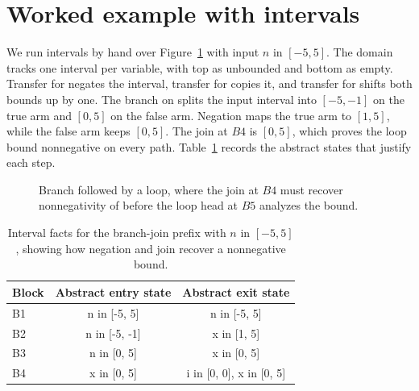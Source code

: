 \section{Worked example with intervals}
\label{sec:ch11-worked}

We run intervals by hand over Figure~\ref{fig:ch11-branch-loop} with input $n$ in $[-5, 5]$.
The domain tracks one interval per variable, with top as unbounded and bottom as empty.
Transfer for  negates the interval, transfer for  copies it, and transfer for  shifts both bounds up by one.
The branch on  splits the input interval into $[-5, -1]$ on the true arm and $[0, 5]$ on the false arm.
Negation maps the true arm to $[1, 5]$, while the false arm keeps $[0, 5]$.
The join at $B4$ is $[0, 5]$, which proves the loop bound nonnegative on every path.
Table~\ref{tab:ch11-intervals} records the abstract states that justify each step.

\begin{figure}
\caption{Branch followed by a loop, where the join at $B4$ must recover nonnegativity of  before the loop head at $B5$ analyzes the bound.}
\label{fig:ch11-branch-loop}
\end{figure}

\begin{table}
\caption{Interval facts for the branch-join prefix with $n$ in $[-5, 5]$, showing how negation and join recover a nonnegative bound.}
\label{tab:ch11-intervals}
\begin{tabular}{lcc}
\toprule
Block & Abstract entry state & Abstract exit state \\
\midrule
B1 & n in [-5, 5] & n in [-5, 5] \\
B2 & n in [-5, -1] & x in [1, 5] \\
B3 & n in [0, 5] & x in [0, 5] \\
B4 & x in [0, 5] & i in [0, 0], x in [0, 5] \\
\bottomrule
\end{tabular}
\end{table}

